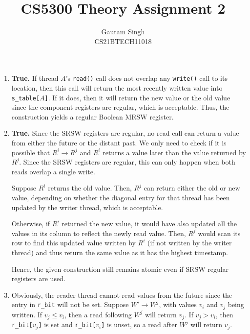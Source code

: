 \documentclass[conference,compsoc]{IEEEtran}
\begin{document}
\vspace{3cm}
\title{CS5300 Theory Assignment 2}
\author{Gautam Singh\\CS21BTECH11018}
\maketitle

\bigskip

\begin{enumerate}
    \item \textbf{True.} If thread \(A\)'s \texttt{read()} call does not overlap
    any \texttt{write()} call to its location, then this call will return the
    most recently written value into \texttt{s\_table[\(A\)]}. If it does, then
    it will return the new value or the old value since the component registers
    are regular, which is acceptable. Thus, the construction yields a regular
    Boolean MRSW register.

    \item \textbf{True.} Since the SRSW registers are regular, no read call can
    return a value from either the future or the distant past. We only need to
    check if it is possible that \(R^i \rightarrow R^j\) and \(R^i\) returns a
    value later than the value returned by \(R^j\). Since the SRSW registers are
    regular, this can only happen when both reads overlap a single write.
    
    Suppose \(R^i\) returns the old value. Then, \(R^j\) can return either the
    old or new value, depending on whether the diagonal entry for that thread
    has been updated by the writer thread, which is acceptable. 
    
    Otherwise, if \(R^i\) returned the new value, it would have also updated all
    the values in its column to reflect the newly read value. Then, \(R^j\)
    would scan its row to find this updated value written by \(R^i\) (if not
    written by the writer thread) and thus return the same value as it has the
    highest timestamp.

    Hence, the given construction still remains atomic even if SRSW regular
    registers are used.

    \item Obviously, the reader thread cannot read values from the future since
    the entry in \texttt{r\_bit} will not be set. Suppose \(W^i \rightarrow
    W^j\), with values \(v_i\) and \(v_j\) being written. If \(v_j \le v_i\),
    then a read following \(W^j\) will return \(v_j\). If \(v_j > v_i\), then
    \texttt{r\_bit[\(v_j\)]} is set and \texttt{r\_bit[\(v_i\)]} is unset, so a
    read after \(W^j\) will return \(v_j\).
    

\end{enumerate}
\end{document}
